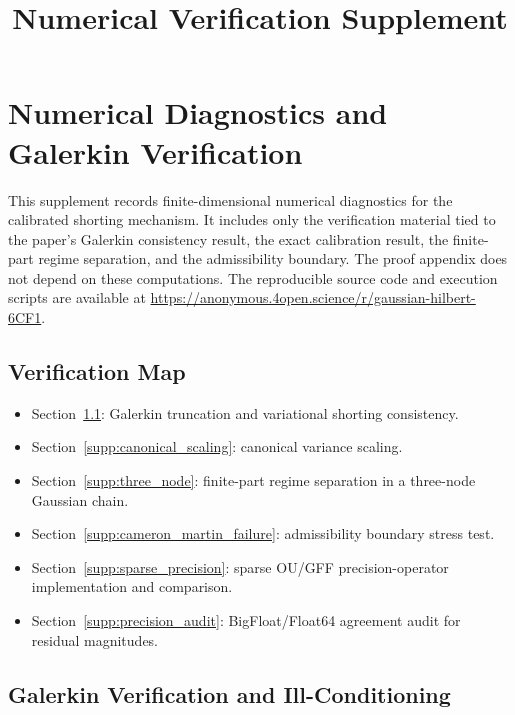 \documentclass[11pt]{article}
\title{Numerical Verification Supplement}
\author{}
\date{}
\begin{document}
    \maketitle

    \section{\texorpdfstring{Numerical Diagnostics and\\ Galerkin Verification}{Numerical Diagnostics and Galerkin Verification}}
    \label{supp:numerical}

    This supplement records finite-dimensional numerical diagnostics for the
    calibrated shorting mechanism. It includes only the verification material tied
    to the paper's Galerkin consistency result, the exact calibration result, the
    finite-part regime separation, and the admissibility boundary. The proof
    appendix does not depend on these computations. The reproducible source code and execution scripts are available at \url{https://anonymous.4open.science/r/gaussian-hilbert-6CF1}.

    \subsection*{Verification Map}
    \label{supp:verification_map}

    \begin{itemize}[leftmargin=*]
        \item Section~\ref{supp:galerkin_verification}: Galerkin truncation and
        variational shorting consistency.
        \item Section~\ref{supp:canonical_scaling}: canonical variance scaling.
        \item Section~\ref{supp:three_node}: finite-part regime separation in a
        three-node Gaussian chain.
        \item Section~\ref{supp:cameron_martin_failure}: admissibility boundary
        stress test.
        \item Section~\ref{supp:sparse_precision}: sparse OU/GFF precision-operator
        implementation and comparison.
        \item Section~\ref{supp:precision_audit}: BigFloat/Float64 agreement audit
        for residual magnitudes.
    \end{itemize}

    \subsection{Galerkin Verification and Ill-Conditioning}
    \label{supp:galerkin_verification}
\end{document}
